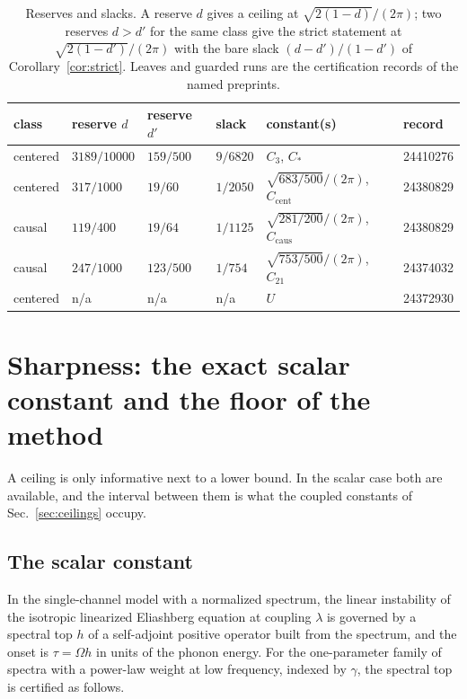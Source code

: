 \documentclass[aps,10pt,superscriptaddress,floatfix,amsmath,amssymb,nofootinbib]{revtex4-2}
\newcommand{\Cthree}{C_{3}}
\newcommand{\Cstar}{C_{*}}
\newcommand{\Ccent}{C_{\mathrm{cent}}}
\newcommand{\Ccaus}{C_{\mathrm{caus}}}
\newcommand{\Ctwoone}{C_{21}}
\newcommand{\Upre}{U}
\begin{document}
\begin{table}[h]
\caption{Reserves and slacks. A reserve $d$ gives a ceiling at $\sqrt{2(1-d)}/(2\pi)$; two
reserves $d>d'$ for the same class give the strict statement at $\sqrt{2(1-d')}/(2\pi)$ with
the bare slack $(d-d')/(1-d')$ of Corollary~\ref{cor:strict}. Leaves and guarded runs are
the certification records of the named preprints.\label{tab:reserve}}
\small
\begin{tabular}{@{}llllll@{}}
\hline
class & reserve $d$ & reserve $d'$ & slack & constant(s) & record \\
\hline
centered & $3189/10000$ & $159/500$ & $9/6820$ & $\Cthree$, $\Cstar$ & 24410276 \\
centered & $317/1000$ & $19/60$ & $1/2050$ & $\sqrt{683/500}/(2\pi)$, $\Ccent$ & 24380829 \\
causal & $119/400$ & $19/64$ & $1/1125$ & $\sqrt{281/200}/(2\pi)$, $\Ccaus$ & 24380829 \\
causal & $247/1000$ & $123/500$ & $1/754$ & $\sqrt{753/500}/(2\pi)$, $\Ctwoone$ & 24374032 \\
centered & n/a & n/a & n/a & $\Upre$ & 24372930 \\
\hline
\end{tabular}
\end{table}

\section{Sharpness: the exact scalar constant and the floor of the method}\label{sec:sharp}

A ceiling is only informative next to a lower bound. In the scalar case both are available,
and the interval between them is what the coupled constants of Sec.~\ref{sec:ceilings}
occupy.

\subsection{The scalar constant}

In the single-channel model with a normalized spectrum, the linear instability of the
isotropic linearized Eliashberg equation at coupling $\lambda$ is governed by a spectral top
$h$ of a self-adjoint positive operator built from the spectrum, and the onset is
$\tau=\Omega h$ in units of the phonon energy. For the one-parameter family of spectra with
a power-law weight at low frequency, indexed by $\gamma$, the spectral top is certified as
follows.
\end{document}
